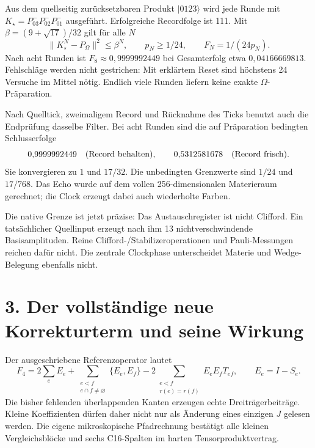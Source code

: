 \documentclass[11pt,a4paper,oneside,parskip=half,headings=normal]{scrreprt}
\newcommand{\ket}[1]{\lvert#1\rangle}
\begin{document}
Aus dem quellseitig zurücksetzbaren Produkt $\ket{0123}$ wird jede Runde mit
$K_\star=P^-_{03}P^-_{02}P^-_{01}$ ausgeführt. Erfolgreiche Recordfolge ist 111. Mit $\beta=(9+\sqrt{17})/32$ gilt für alle $N$
\begin{equation}
\|K_\star^N-P_\Omega\|^2\le\beta^N,\qquad
p_N\ge1/24,\qquad F_N=1/(24p_N).
\end{equation}
Nach acht Runden ist $F_8\approx0{,}9999992449$ bei Gesamterfolg etwa $0{,}04166669813$. Fehlschläge werden nicht gestrichen: Mit erklärtem Reset sind höchstens 24 Versuche im Mittel nötig. Endlich viele Runden liefern keine exakte $\Omega$-Präparation.

Nach Quelltick, zweimaligem Record und Rücknahme des Ticks benutzt auch die Endprüfung dasselbe Filter. Bei acht Runden sind die auf Präparation bedingten Schlusserfolge
\begin{equation}
0{,}9999992449\quad\hbox{(Record behalten)},\qquad
0{,}5312581678\quad\hbox{(Record frisch)}.
\end{equation}
Sie konvergieren zu $1$ und $17/32$. Die unbedingten Grenzwerte sind $1/24$ und $17/768$. Das Echo wurde auf dem vollen 256-dimensionalen Materieraum gerechnet; die Clock erzeugt dabei auch wiederholte Farben.

Die native Grenze ist jetzt präzise: Das Austauschregister ist nicht Clifford. Ein tatsächlicher Quellinput erzeugt nach ihm 13 nichtverschwindende Basisamplituden. Reine Clifford-/Stabilizeroperationen und Pauli-Messungen reichen dafür nicht. Die zentrale Clockphase unterscheidet Materie und Wedge-Belegung ebenfalls nicht.

\section*{3. Der vollständige neue Korrekturterm und seine Wirkung}
Der ausgeschriebene Referenzoperator lautet
\begin{equation}
F_4=2\sum_eE_e+
\sum_{\substack{e<f\\e\cap f\ne\varnothing}}\{E_e,E_f\}
-2\sum_{\substack{e<f\\r(e)=r(f)}}E_eE_fT_{ef},
\qquad E_e=I-S_e.
\end{equation}
Die bisher fehlenden überlappenden Kanten erzeugen echte Dreiträgerbeiträge. Kleine Koeffizienten dürfen daher nicht nur als Änderung eines einzigen $J$ gelesen werden. Die eigene mikroskopische Pfadrechnung bestätigt alle kleinen Vergleichsblöcke und sechs C16-Spalten im harten Tensorproduktvertrag.
\end{document}
